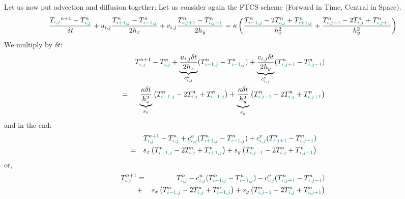 Let us now put advection and diffusion together:
Let us consider again the FTCS scheme (Forward in Time, Central in Space).
\begin{equation}
\frac{T_{\color{teal}i,j}^{n+1}-T^n_{\color{teal}i,j}}{\delta t} 
+ u_{i,j} \frac{T^n_{\color{teal}i+1,j} - T^n_{{\color{teal}i-1,j}}}{2h_x} 
+ v_{i,j} \frac{T^n_{\color{teal}i,j+1} - T^n_{{\color{teal}i,j-1}}}{2h_y} =
\kappa 
\left(
\frac{ T_{{\color{teal}i-1,j}}^{n}-2T_{{\color{teal}i,j}}^{n}+T_{{\color{teal}i+1,j}}^{n}  }{h_x^2} + 
\frac{ T_{{\color{teal}i,j-1}}^{n}-2T_{{\color{teal}i,j}}^{n}+T_{{\color{teal}i,j+1}}^{n}  }{h_y^2}
\right)
\end{equation}
We multiply by $\delta t$:
\begin{eqnarray}
&&T_{{\color{teal}i,j}}^{n+1}-T^n_{\color{teal}i,j}
+ \underbrace{\frac{u_{i,j} \delta t}{2h_x}}_{c^u_{i,j}} (T^n_{\color{teal}i+1,j} - T^n_{{\color{teal}i-1,j}}) 
+ \underbrace{\frac{v_{i,j} \delta t}{2h_y}}_{c^v_{i,j}} (T^n_{\color{teal}i,j+1} - T^n_{{\color{teal}i,j-1}}) \nonumber\\
&=&
\underbrace{\frac{\kappa   \delta t}{h_x^2}}_{s_x}
\left(
 T_{{\color{teal}i-1,j}}^{n}-2T_{{\color{teal}i,j}}^{n}+T_{{\color{teal}i+1,j}}^{n}
\right) +
\underbrace{\frac{\kappa   \delta t}{h_y^2}}_{s_y}
\left(
T_{{\color{teal}i,j-1}}^{n}-2T_{{\color{teal}i,j}}^{n}+T_{{\color{teal}i,j+1}}^{n} 
\right)
\end{eqnarray}
and in the end:
\begin{eqnarray}
&&T_{{\color{teal}i,j}}^{n+1}-T^n_{\color{teal}i,j}
+ c^u_{{\color{teal} i,j}} (T^n_{\color{teal}i+1,j} - T^n_{{\color{teal}i-1,j}}) 
+ c^v_{{\color{teal} i,j}} (T^n_{\color{teal}i,j+1} - T^n_{{\color{teal}i,j-1}}) \nonumber\\
&=&
s_x
\left(
 T_{{\color{teal}i-1,j}}^{n}-2T_{{\color{teal}i,j}}^{n}+T_{{\color{teal}i+1,j}}^{n}
\right) +
s_y
\left(
T_{{\color{teal}i,j-1}}^{n}-2T_{{\color{teal}i,j}}^{n}+T_{{\color{teal}i,j+1}}^{n} 
\right)
\end{eqnarray}
or,
\begin{eqnarray}
T_{{\color{teal}i,j}}^{n+1}
&=&T^n_{\color{teal}i,j}
- c^u_{{\color{teal} i,j}} (T^n_{\color{teal}i+1,j} - T^n_{{\color{teal}i-1,j}}) 
- c^v_{{\color{teal} i,j}} (T^n_{\color{teal}i,j+1} - T^n_{{\color{teal}i,j-1}}) \nonumber\\
&+&
s_x
\left(
 T_{{\color{teal}i-1,j}}^{n}-2T_{{\color{teal}i,j}}^{n}+T_{{\color{teal}i+1,j}}^{n}
\right) +
s_y
\left(
T_{{\color{teal}i,j-1}}^{n}-2T_{{\color{teal}i,j}}^{n}+T_{{\color{teal}i,j+1}}^{n} 
\right)
\end{eqnarray}
